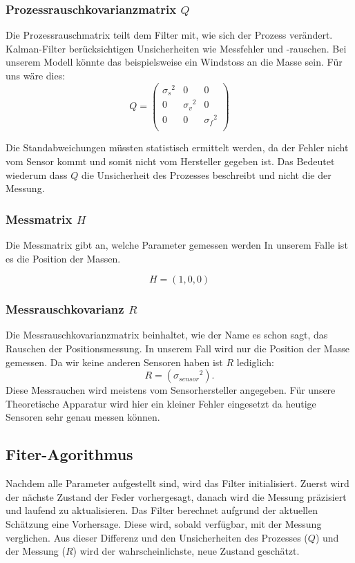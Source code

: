 \subsubsection*{Prozessrauschkovarianzmatrix $Q$}
Die Prozessrauschmatrix teilt dem Filter mit, wie sich der Prozess verändert. 
Kalman-Filter berücksichtigen Unsicherheiten wie Messfehler und -rauschen. 
Bei unserem Modell könnte das beispielsweise ein Windstoss an die Masse sein. 
Für uns wäre dies:
\[ 
Q = \left(
 \begin{array}{ccc} 	
{\sigma_s }^2& 0& 0 \\ 
0 & {\sigma_v }^2& 0\\ 
0 & 0& {\sigma_f }^2\\
\end{array}\right)  
 \]

Die Standabweichungen müssten statistisch ermittelt werden, da der Fehler nicht vom Sensor kommt und somit nicht vom Hersteller gegeben ist. 
Das Bedeutet wiederum dass $Q$ die Unsicherheit des Prozesses beschreibt und nicht die der Messung.

\subsubsection*{Messmatrix $H$}
Die Messmatrix gibt an, welche Parameter gemessen werden
In unserem Falle ist es die Position der Massen. 

\[ H = (1, 0, 0) \]

\subsubsection*{Messrauschkovarianz $R$}
Die Messrauschkovarianzmatrix beinhaltet, wie der Name es schon sagt, das Rauschen der Positionsmessung. 
In unserem Fall wird nur die Position der Masse gemessen. Da wir keine anderen Sensoren haben ist $R$ lediglich:
\[ R= ({\sigma_{sensor}}^2).
 \] 
Diese Messrauchen wird meistens vom Sensorhersteller angegeben. 
Für unsere Theoretische Apparatur wird hier ein kleiner Fehler eingesetzt da heutige Sensoren sehr genau messen können. 

\subsection{Fiter-Agorithmus}
Nachdem alle Parameter aufgestellt sind, wird das Filter initialisiert.
Zuerst wird der nächste Zustand der Feder vorhergesagt, danach wird die Messung präzisiert und laufend zu aktualisieren. 
Das Filter berechnet aufgrund der aktuellen Schätzung eine Vorhersage. 
Diese wird, sobald verfügbar, mit der Messung verglichen. 
Aus dieser Differenz und den Unsicherheiten des Prozesses ($Q$) und der Messung ($R$) wird der wahrscheinlichste, neue Zustand geschätzt.

